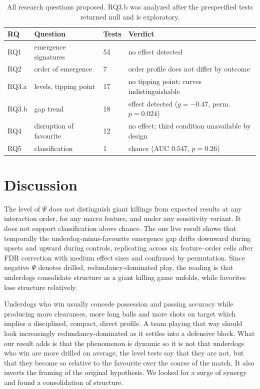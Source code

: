 \documentclass[11pt,a4paper]{article}
\begin{document}
\begin{table}[H]
\centering
\small
\begin{tabular}{@{}llll@{}}
\toprule
RQ & Question & Tests & Verdict \\
\midrule
RQ1 & emergence signatures & 54 & no effect detected \\
RQ2 & order of emergence & 7 & order profile does not differ by outcome \\
RQ3.a & levels, tipping point & 17 & no tipping point; curves indistinguishable \\
RQ3.b & gap trend & 18 & effect detected ($g=-0.47$, perm.\ $p=0.024$) \\
RQ4 & disruption of favourite & 12 & no effect; third condition unavailable by design \\
RQ5 & classification & 1 & chance (AUC $0.547$, $p=0.26$) \\
\bottomrule
\end{tabular}
\caption{All research questions proposed. RQ3.b was analyzed after the prespecified tests returned
null and is exploratory.}
\label{tab:summary}
\end{table}

\section{Discussion}
\label{sec:discussion}


The level of $\Psi$ does not distinguish giant killings from expected results at any
interaction order, for any macro feature, and under any sensitivity variant. It does not
support classification above chance. The one live result shows that temporally the
underdog-minus-favourite emergence gap drifts downward during upsets and upward during
controls, replicating across six feature--order cells after FDR correction with medium
effect sizes and confirmed by permutation. Since negative $\Psi$ denotes drilled,
redundancy-dominated play, the reading is that underdogs consolidate structure as a
giant killing game unfolds, while favorites lose structure relatively.

Underdogs
who win usually concede possession and passing accuracy while producing more clearances, more long
balls and more shots on target which implies a disciplined, compact, direct profile. A team playing
that way should look increasingly redundancy-dominated as it settles into a defensive
block. What our result adds is that the phenomenon is dynamic so it is not that
underdogs who win are more drilled on average, the level tests say that they are
not, but that they become so relative to the favourite over the course of the
match. It also inverts the framing of the original hypothesis. We looked for a surge of
synergy and found a consolidation of structure.
\end{document}

